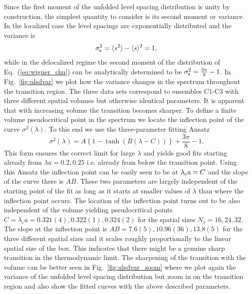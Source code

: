 \documentclass[twocolumn, prd, preprintnumbers, amsmath,
  amssymb, showpacs, floatfix]{revtex4-1}
\newcommand{\msub}[1]{\ensuremath _{\mbox{\scriptsize #1}}}
\begin{document}
Since the first moment of the unfolded level spacing distribution is unity by
construction, the simplest quantity to consider is its second moment or
variance.  In the localized case the level spacings are exponentially
distributed and the variance is 
\begin{equation}
 \sigma\msub{s}^2 = \langle s^2 \rangle - \langle s \rangle^2=1,
\end{equation}
while in the delocalized regime the second moment of the distribution of
Eq.\ (\ref{eq:wigner_chu}) can be analytically determined to be
$\sigma\msub{s}^2=\frac{3\pi}{8}-1$. In Fig.~\ref{fig:ulsdvar} we plot how the
variance changes in the spectrum throughout the transition region. The three
data sets correspond to ensembles C1-C3 with three different spatial volumes
but otherwise identical parameters. It is apparent that with increasing volume
the transition becomes sharper. To define a finite volume pseudocritical point
in the spectrum we locate the inflection point of the curve
$\sigma^2(\lambda)$. To this end we use the three-parameter fitting Ansatz
\begin{equation}
  \sigma^2(\lambda) = A\left\{ 1 - \tanh(B(\lambda-C)) \right\} + 
          \frac{3\pi}{8}-1.
    \label{eq:tanh}
\end{equation}
This form ensures the correct limit for large $\lambda$ and yields good fits
starting already from $\lambda a = 0.2, 0.25$ i.e. already from below the
transition point. Using this Ansatz the inflection point can be easily seen to
be at $\lambda\msub{c} a=C$ and the slope of the curve there is $AB$. These
two parameters are largely independent of the starting point of the fit as
long as it starts at smaller values of $\lambda$ than where the inflection
point occurs. The location of the inflection point turns out to be also
independent of the volume yielding pseudocritical points $C=\lambda_ca =
0.321(4), 0.322(1), 0.324(2)$ for the spatial sizes $N_s=16, 24, 32$. The
slope at the inflection point is $AB=7.6(5), 10.96(36), 13.8(5)$ for the three
different spatial sizes and it scales roughly proportionally to the linear
spatial size of the box. This indicates that there might be a genuine sharp
transition in the thermodynamic limit. The sharpening of the transition with
the volume can be better seen in Fig.~\ref{fig:ulsdvar_zoom} where we plot
again the variance of the unfolded level spacing distribution but zoom in on
the transition region and also show the fitted curves with the above described
parameters.
\end{document}
